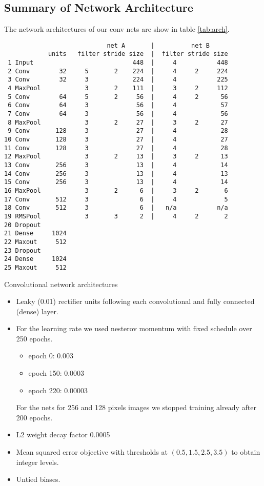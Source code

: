 \documentclass[12pt,a4paper]{scrartcl}
\begin{document}
\subsection{Summary of Network Architecture}
The network architectures of our conv nets are show in table \ref{tab:arch}.
\begin{table}[ht]
{\small
\begin{verbatim}
                            net A       |          net B
            units   filter stride size  |  filter stride size
 1 Input                           448  |     4           448
 2 Conv        32     5       2    224  |     4     2     224
 3 Conv        32     3            224  |     4           225 
 4 MaxPool            3       2    111  |     3     2     112 
 5 Conv        64     5       2     56  |     4     2      56
 6 Conv        64     3             56  |     4            57
 7 Conv        64     3             56  |     4            56
 8 MaxPool            3       2     27  |     3     2      27
 9 Conv       128     3             27  |     4            28
10 Conv       128     3             27  |     4            27
11 Conv       128     3             27  |     4            28
12 MaxPool            3       2     13  |     3     2      13
13 Conv       256     3             13  |     4            14
14 Conv       256     3             13  |     4            13
15 Conv       256     3             13  |     4            14
16 MaxPool            3       2      6  |     3     2       6
17 Conv       512     3              6  |     4             5
18 Conv       512     3              6  |   n/a           n/a
19 RMSPool            3       3      2  |     4     2       2
20 Dropout
21 Dense     1024
22 Maxout     512
23 Dropout
24 Dense     1024
25 Maxout     512
\end{verbatim}
}
\caption{Convolutional network architectures}
\label{tab:arch}
\end{table}

\begin{itemize}
\item
  Leaky (0.01) rectifier units following each convolutional and fully connected (dense) layer.
\item
  For the learning rate we used nesterov momentum with fixed schedule over 250 epochs.
  \begin{itemize}
  \item
    epoch 0: 0.003
  \item
    epoch 150: 0.0003
  \item
    epoch 220: 0.00003
  \end{itemize}
      For the nets for 256 and 128 pixels images we stopped training
      already after 200 epochs.
\item
  L2 weight decay factor 0.0005
\item
  Mean squared error objective with thresholds at $(0.5, 1.5, 2.5, 3.5)$ to obtain integer levels.
\item
  Untied biases.
\end{itemize}
%
\end{document}
